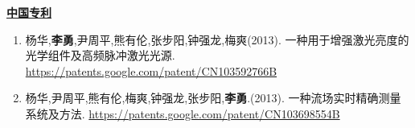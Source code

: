 \documentclass[a4paper,fontsize=11pt]{scrartcl} %
\newcommand{\stitle}[1]{
	\noindent\underline{\textbf{#1}} \normalsize\par}
\begin{document}
\stitle{中国专利}
\begin{enumerate}
	\setlength\itemsep{0.0cm}
	\item 杨华,\textbf{李勇},尹周平,熊有伦,张步阳,钟强龙,梅爽(2013). 一种用于增强激光亮度的光学组件及高频脉冲激光光源. \href{https://patents.google.com/patent/CN103592766B}{https://patents.google.com/patent/CN103592766B}
	\item 杨华,尹周平,熊有伦,梅爽,钟强龙,张步阳,\textbf{李勇}.(2013). 一种流场实时精确测量系统及方法. \href{https://patents.google.com/patent/CN103698554B}{https://patents.google.com/patent/CN103698554B}
\end{enumerate}
\end{document}

